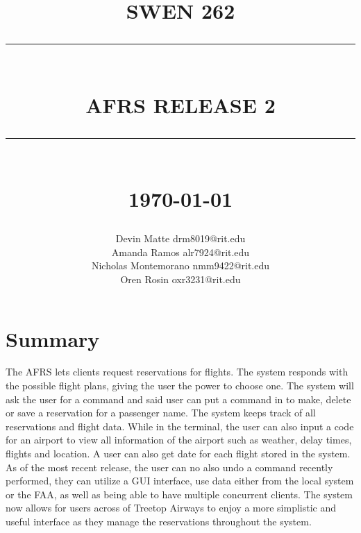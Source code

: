 \documentclass[12pt]{report}
\newcommand{\HRule}[1]{\rule{\linewidth}{#1}}
\begin{document}
    \title{ \normalsize \textsc{SWEN 262}
    \\ [2.0cm]
    \HRule{0.5pt} \\
    \LARGE \textbf{\uppercase{AFRS Release 2}}
    \HRule{2pt} \\ [0.5cm]
    \normalsize \today \vspace*{5\baselineskip}}

    \date{}

    \author{
    Devin Matte drm8019@rit.edu \\
    Amanda Ramos alr7924@rit.edu \\
    Nicholas Montemorano nmm9422@rit.edu \\
    Oren Rosin oxr3231@rit.edu
    }

    \maketitle
    \tableofcontents
    \newpage

    \sectionfont{\scshape}


    \section*{Summary}\label{sec:summary}

    \indent
    The AFRS lets clients request reservations for flights.
    The system responds with the possible flight plans, giving the user the power to choose one.
    The system will ask the user for a command and said user can put a command in to make, delete or save a reservation for a passenger name.
    The system keeps track of all reservations and flight data.
    While in the terminal, the user can also input a code for an airport to view all information of the airport such as weather, delay times, flights and location.
    A user can also get date for each flight stored in the system.
    \newline
    \indent
    As of the most recent release, the user can no also undo a command recently performed, they can utilize a GUI interface, use data either from the local system or the FAA, as well as being able to have multiple concurrent clients.
    The system now allows for users across of Treetop Airways to enjoy a more simplistic and useful interface as they manage the reservations throughout the system.
    \newpage
\end{document}
